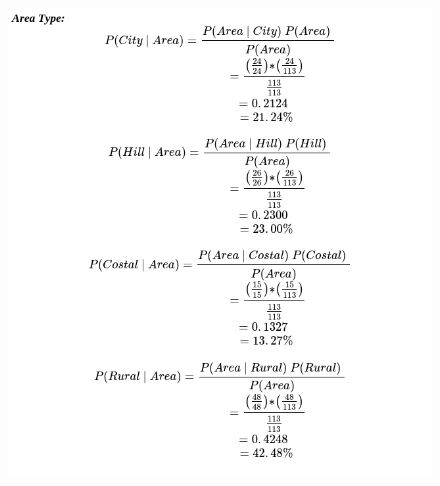 \documentclass{article}
\begin{document}
        \begin{figure}[!htb]
            \includegraphics[width=1\textwidth]{Images/area.png}
        \end{figure} 
\end{document}
